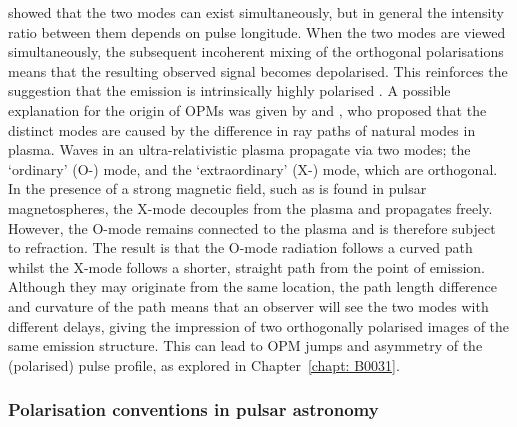 \citet{MSxx2000} showed that the two modes can exist simultaneously, but in general the intensity ratio between them depends on pulse longitude. When the two modes are viewed simultaneously, the subsequent incoherent mixing of the orthogonal polarisations means that the resulting observed signal becomes depolarised. This reinforces the suggestion that the emission is intrinsically highly polarised \citep[e.g.][]{BRxx1980,SCR+1984, MSxx1998}.
A possible explanation for the origin of OPMs was given by \citet{Mxxx1979} and \citet{ABxx1986}, who proposed that the distinct modes are caused by the difference in ray paths of natural modes in plasma. Waves in an ultra-relativistic plasma propagate via two modes; the `ordinary' (O-) mode, and the `extraordinary' (X-) mode, which are orthogonal. In the presence of a strong magnetic field, such as is found in pulsar magnetospheres, the X-mode decouples from the plasma and propagates freely. However, the O-mode remains connected to the plasma and is therefore subject to refraction. The result is that the O-mode radiation follows a curved path whilst the X-mode follows a shorter, straight path from the point of emission. Although they may originate from the same location, the path length difference and curvature of the path means that an observer will see the two modes with different delays, giving the impression of two orthogonally polarised images of the same emission structure. This can lead to OPM jumps and asymmetry of the (polarised) pulse profile, as explored in Chapter~\ref{chapt: B0031}.


\subsubsection{Polarisation conventions in pulsar astronomy}
\label{sec: intro - emission models - polarisation - conventions}

